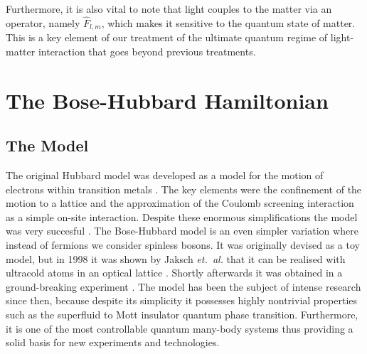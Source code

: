 Furthermore, it is also vital to note that light couples to the matter
via an operator, namely $\hat{F}_{l,m}$, which makes it sensitive to
the quantum state of matter. This is a key element of our treatment of
the ultimate quantum regime of light-matter interaction that goes
beyond previous treatments.

\section{The Bose-Hubbard Hamiltonian}

\subsection{The Model}

The original Hubbard model was developed as a model for the motion of
electrons within transition metals \cite{hubbard1963}. The key
elements were the confinement of the motion to a lattice and the
approximation of the Coulomb screening interaction as a simple on-site
interaction. Despite these enormous simplifications the model was very
succesful \cite{leggett}. The Bose-Hubbard model is an even simpler
variation where instead of fermions we consider spinless bosons. It
was originally devised as a toy model, but in 1998 it was shown by
Jaksch \emph{et.~al.} that it can be realised with ultracold atoms in
an optical lattice \cite{jaksch1998}. Shortly afterwards it was
obtained in a ground-breaking experiment \cite{greiner2002}. The model
has been the subject of intense research since then, because despite
its simplicity it possesses highly nontrivial properties such as the
superfluid to Mott insulator quantum phase transition. Furthermore, it
is one of the most controllable quantum many-body systems thus
providing a solid basis for new experiments and technologies.

